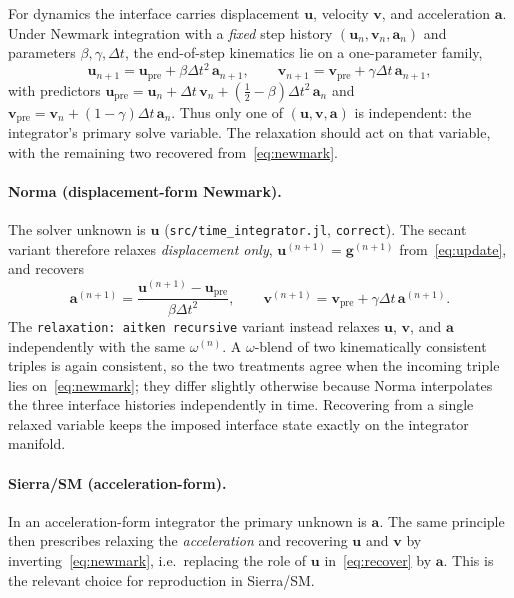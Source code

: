 \documentclass[11pt]{article}
\begin{document}
For dynamics the interface carries displacement $\bm{u}$, velocity $\bm{v}$,
and acceleration $\bm{a}$. Under Newmark integration with a \emph{fixed}
step history $(\bm{u}_n,\bm{v}_n,\bm{a}_n)$ and parameters $\beta,\gamma,\Delta
t$, the end-of-step kinematics lie on a one-parameter family,
\begin{equation}
    \bm{u}_{n+1} = \bm{u}_{\mathrm{pre}} + \beta\Delta t^2\,\bm{a}_{n+1},
    \qquad
    \bm{v}_{n+1} = \bm{v}_{\mathrm{pre}} + \gamma\Delta t\,\bm{a}_{n+1},
    \label{eq:newmark}
\end{equation}
with predictors
$\bm{u}_{\mathrm{pre}} = \bm{u}_n + \Delta t\,\bm{v}_n
 + (\tfrac12 - \beta)\Delta t^2\,\bm{a}_n$ and
$\bm{v}_{\mathrm{pre}} = \bm{v}_n + (1-\gamma)\Delta t\,\bm{a}_n$.
Thus only one of $(\bm{u},\bm{v},\bm{a})$ is independent: the integrator's
primary solve variable. The relaxation should act on that variable, with the
remaining two recovered from~\eqref{eq:newmark}.

\paragraph{Norma (displacement-form Newmark).}
The solver unknown is $\bm{u}$ (\texttt{src/time\_integrator.jl}, \texttt{correct}).
The secant variant therefore relaxes \emph{displacement only},
$\bm{u}^{(n+1)} = \bm{g}^{(n+1)}$ from~\eqref{eq:update}, and recovers
\begin{equation}
    \bm{a}^{(n+1)} = \frac{\bm{u}^{(n+1)} - \bm{u}_{\mathrm{pre}}}{\beta\Delta t^2},
    \qquad
    \bm{v}^{(n+1)} = \bm{v}_{\mathrm{pre}} + \gamma\Delta t\,\bm{a}^{(n+1)} .
    \label{eq:recover}
\end{equation}
The \texttt{relaxation: aitken recursive} variant instead relaxes
$\bm{u}$, $\bm{v}$, and $\bm{a}$ independently with the same $\omega^{(n)}$. A
$\omega$-blend of two kinematically consistent triples is again consistent, so
the two treatments agree when the incoming triple lies on~\eqref{eq:newmark};
they differ slightly otherwise because Norma interpolates the three interface
histories independently in time. Recovering from a single relaxed variable
keeps the imposed interface state exactly on the integrator manifold.

\paragraph{Sierra/SM (acceleration-form).}
In an acceleration-form integrator the primary unknown is $\bm{a}$. The same
principle then prescribes relaxing the \emph{acceleration} and recovering
$\bm{u}$ and $\bm{v}$ by inverting~\eqref{eq:newmark}, i.e.\ replacing the role
of $\bm{u}$ in~\eqref{eq:recover} by $\bm{a}$. This is the relevant choice for
reproduction in Sierra/SM.
\end{document}
